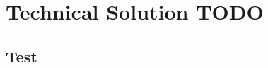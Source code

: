 \documentclass[./project-report/src/latex/project-report.tex]{subfiles}
\begin{document}
\maketitle

\section{Technical Solution TODO}

\subsection{Test}

\inputminted[firstline=0,lastline=5]{python}{./school_project/__main__.py}
\end{document}
